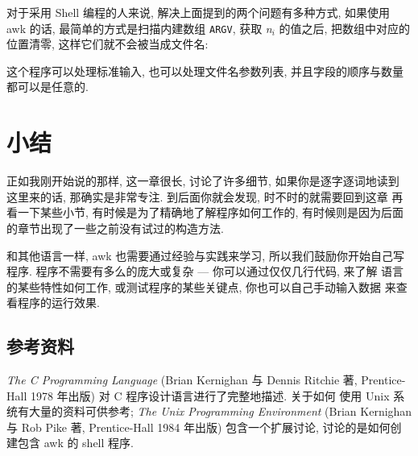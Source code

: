 对于采用 Shell 编程的人来说, 解决上面提到的两个问题有多种方式, 如果使用
awk 的话, 最简单的方式是扫描内建数组 \verb'ARGV', 获取 \textit{n}$_i$
的值之后, 把数组中对应的位置清零, 这样它们就不会被当成文件名:
这个程序可以处理标准输入, 也可以处理文件名参数列表, 并且字段的顺序与数量
都可以是任意的.

\section{小结}
\label{sec:the_awk_language_summary}

正如我刚开始说的那样, 这一章很长, 讨论了许多细节, 如果你是逐字逐词地读到
这里来的话, 那确实是非常专注. 到后面你就会发现, 时不时的就需要回到这章
再看一下某些小节, 有时候是为了精确地了解程序如何工作的, 有时候则是因为后面
的章节出现了一些之前没有试过的构造方法.

和其他语言一样, awk 也需要通过经验与实践来学习, 所以我们鼓励你开始自己写
程序. 程序不需要有多么的庞大或复杂 --- 你可以通过仅仅几行代码, 来了解
语言的某些特性如何工作, 或测试程序的某些关键点, 你也可以自己手动输入数据
来查看程序的运行效果.

\subsection*{参考资料}
\label{subsec:bibliographic_notes}

\textit{The C Programming Language} (Brian Kernighan 与 Dennis Ritchie 著,
Prentice-Hall 1978 年出版) 对 C 程序设计语言进行了完整地描述. 关于如何
使用 Unix 系统有大量的资料可供参考; \textit{The Unix Programming
Environment} (Brian Kernighan 与 Rob Pike 著, Prentice-Hall 1984 年出版)
包含一个扩展讨论, 讨论的是如何创建包含 awk 的 shell 程序.
